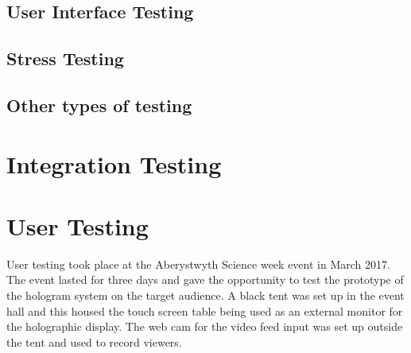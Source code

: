 \subsection{User Interface Testing}

\subsection{Stress Testing}

\subsection{Other types of testing}

\section{Integration Testing}

\section{User Testing}
User testing took place at the Aberystwyth Science week event in March 2017. The event lasted for three days and gave the opportunity to test the prototype of the hologram system on the target audience. A black tent was set up in the event hall and this housed the touch screen table being used as an external monitor for the holographic display. The web cam for the video feed input was set up outside the tent and used to record viewers.

  